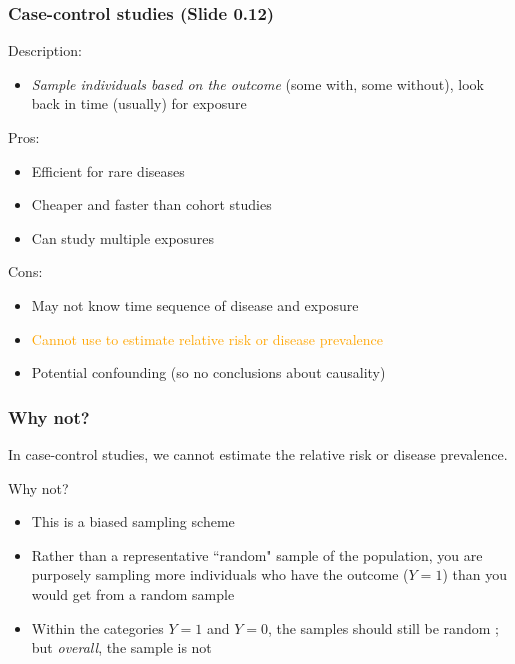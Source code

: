 \documentclass[12pt, 
hyperref={colorlinks=true, linkcolor=blue, urlcolor=cyan}]{beamer}
\begin{document}
\begin{frame}[noframenumbering]
\frametitle{Case-control studies (Slide 0.12)}
Description: \vspace{-0.3cm}
\begin{itemize}
\item \textit{Sample individuals based on the outcome} (some with, some without), look back in time (usually) for exposure %
\end{itemize}

Pros:\vspace{-0.3cm}
\begin{itemize}
\item Efficient for rare diseases %
\item Cheaper and faster than cohort studies
\item Can study multiple exposures
\end{itemize}

Cons:\vspace{-0.3cm}
\begin{itemize}
\item May not know time sequence of disease and exposure
\item \textcolor{orange}{Cannot use to estimate relative risk or disease prevalence}
\item Potential confounding (so no conclusions about causality)
\end{itemize}
\end{frame}

\begin{frame}
\frametitle{Why not?}

In case-control studies, we cannot estimate the relative risk or disease prevalence.

Why not? 
\begin{itemize}
\item This is a biased sampling scheme 
\item Rather than a representative ``random" sample of the population, you are purposely sampling more individuals who have the outcome ($Y = 1$) than you would get from a random sample 
\item Within the categories $Y = 1$ and $Y = 0$, the samples should still be random ; but \textit{overall}, the sample is not 
\end{itemize}

\end{frame}
\end{document}
